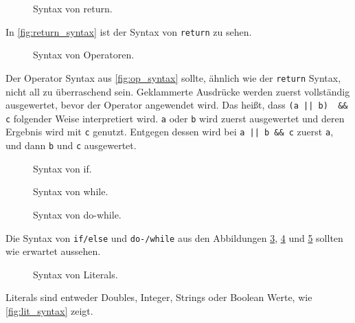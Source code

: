     \begin{figure}[H]
      \centering
      
      \caption{Syntax von return.}
      \label{fig:return_syntax}
    \end{figure}
    In \autoref{fig:return_syntax} ist der Syntax von \lstinline[style=MyMacroStyle]$return$ zu sehen.

    \begin{figure}[H]
      \centering
      
      \caption{Syntax von Operatoren.}
      \label{fig:op_syntax}
    \end{figure}
    Der Operator Syntax aus \autoref{fig:op_syntax} sollte, ähnlich wie der \lstinline[style=MyMacroStyle]$return$ Syntax, nicht all zu überraschend sein. Geklammerte Ausdrücke werden zuerst vollständig ausgewertet, bevor der Operator angewendet wird. Das heißt, dass \lstinline[style=MyMacroStyle]$(a || b)  && c$ folgender Weise interpretiert wird. \lstinline[style=MyMacroStyle]$a$ oder \lstinline[style=MyMacroStyle]$b$ wird zuerst ausgewertet und deren Ergebnis wird mit \lstinline[style=MyMacroStyle]$c$ genutzt. Entgegen dessen wird bei \lstinline[style=MyMacroStyle]$a || b && c$ zuerst \lstinline[style=MyMacroStyle]$a$, und dann \lstinline[style=MyMacroStyle]$b$ und \lstinline[style=MyMacroStyle]$c$ ausgewertet.

    \begin{figure}[H]
      \centering
      
      \caption{Syntax von if.}
      \label{fig:if_syntax}
    \end{figure}

    \begin{figure}[H]
      \centering
      
      \caption{Syntax von while.}
      \label{fig:while_syntax}
    \end{figure}

    \begin{figure}[H]
      \centering
      
      \caption{Syntax von do-while.}
      \label{fig:do_while_syntax}
    \end{figure}
    Die Syntax von \lstinline[style=MyMacroStyle]$if/else$ und \lstinline[style=MyMacroStyle]$do-/while$ aus den Abbildungen \ref{fig:if_syntax}, \ref{fig:while_syntax} und \ref{fig:do_while_syntax} sollten wie erwartet aussehen.

    \begin{figure}[H]
      \centering
      
      \caption{Syntax von Literals.}
      \label{fig:lit_syntax}
    \end{figure}
    Literals sind entweder Doubles, Integer, Strings oder Boolean Werte, wie \autoref{fig:lit_syntax} zeigt.

